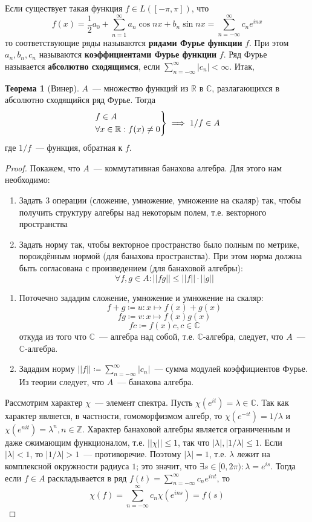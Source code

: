 \documentclass[12pt]{extarticle}
\theoremstyle{definition}
\newtheorem{theorem}{\indent Теорема}[section]
\begin{document}
  		Если существует такая функция $f\in L([-\pi,\pi])$, что $$f(x)=\frac{1}{2}a_0+\sum_{n=1}^{\infty} a_n \cos nx+b_n \sin nx=\sum_{n=-\infty}^\infty c_n e^{inx}$$
  		то соответствующие ряды называются \textbf{рядами Фурье функции} $f$. При этом $a_n,b_n, c_n$ называются \textbf{коэффициентами Фурье функции} $f$. Ряд Фурье называется \textbf{абсолютно сходящимся}, если $\sum_{n=-\infty}^\infty |c_n|<\infty$. Итак,
        \begin{theorem}[Винер]\label{th:Wiener}
        $A$~--- множество функций из $\mathbb{R}$ в $\mathbb{C}$, разлагающихся в абсолютно сходящийся ряд Фурье. Тогда
      $$
    \begin{drcases}
		f\in A\\
		 \forall x\in\mathbb{R}: f(x)\neq 0
    \end{drcases}\implies 1/f\in A
    $$
    где $1/f$~--- функция, обратная к $f$.
    \begin{proof}
		Покажем, что $A$~--- коммутативная банахова алгебра. Для этого нам необходимо:
		\begin{enumerate}
			\item Задать 3 операции (сложение, умножение, умножение на скаляр) так, чтобы получить структуру алгебры над некоторым полем, т.е. векторного пространства
			\item Задать норму так, чтобы векторное пространство было полным по метрике, порождённым нормой (для банахова пространства). При этом норма должна быть согласована с произведением (для банаховой алгебры):
			$$\forall f,g\in A: ||fg||\leq ||f||\cdot||g||$$
		\end{enumerate}
		\begin{enumerate}
			\item Поточечно зададим сложение, умножение и умножение на скаляр:
				$$
			f+g\coloneq u: x\mapsto f(x)+g(x)
			$$
			$$fg\coloneq v:x\mapsto f(x)g(x)$$
			$$fc\coloneq f(x)c,c\in\mathbb{C}$$
			откуда из того что $\mathbb{C}$~--- алгебра над собой, т.е. $\mathbb{C}$-алгебра, следует, что $A$~--- $\mathbb{C}$-алгебра.
			\item Зададим норму $||f||\coloneq\sum_{n=-\infty}^\infty |c_n|$~--- сумма модулей коэффициентов Фурье. Из теории следует, что $A$~--- банахова алгебра.
		\end{enumerate}

		Рассмотрим характер $\chi$~--- элемент спектра. Пусть $\chi(e^{it})=\lambda\in\mathbb{C}$. Так как характер является, в частности, гомоморфизмом алгебр, то $\chi(e^{-it})=1/\lambda$ и $\chi(e^{nit})=\lambda^n,n\in\mathbb{Z}$. Характер банаховой алгебры является ограниченным и даже сжимающим функционалом, т.е. $||\chi||\leq 1$, так что $|\lambda|, |1/\lambda|\leq 1$. Если $|\lambda|<1$, то $|1/\lambda|>1$~--- противоречие. Поэтому $|\lambda|=1$, т.е. $\lambda$ лежит на комплексной окружности радиуса $1$; это значит, что $\exists s\in [0,2\pi):\lambda=e^{is}$. Тогда если $f\in A$ раскладывается в ряд $f(t)=\sum_{n=-\infty}^{\infty} c_n e^{int}$, то
		$$\chi(f)=\sum_{n=-\infty}^{\infty} c_n \chi (e^{ins})=f(s)$$


\end{proof}
\end{theorem}
\end{document}
